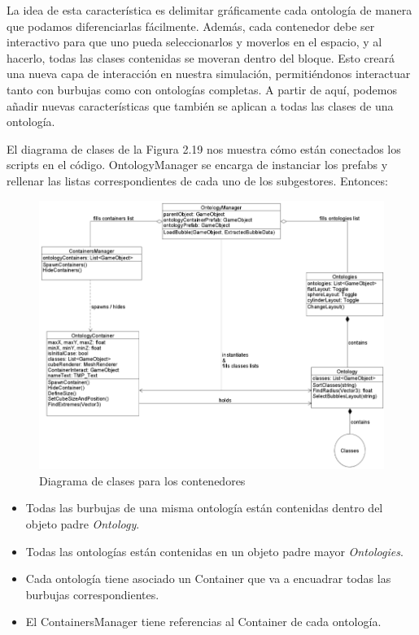 La idea de esta característica es delimitar gráficamente cada ontología de manera que podamos diferenciarlas fácilmente. Además, cada contenedor debe ser interactivo para que uno pueda seleccionarlos y moverlos en el espacio, y al hacerlo, todas las clases contenidas se moveran dentro del bloque. Esto creará una nueva capa de interacción en nuestra simulación, permitiéndonos interactuar tanto con burbujas como con ontologías completas. A partir de aquí, podemos añadir nuevas características que también se aplican a todas las clases de una ontología.

El diagrama de clases de la Figura 2.19 nos muestra cómo están conectados los scripts en el código. OntologyManager se encarga de instanciar los prefabs y rellenar las listas correspondientes de cada uno de los subgestores. Entonces:

\begin{figure}[ht]
   \begin{center}
      \includegraphics[width=1\linewidth]{chapter2/figures/containers_2.0.png}
   \end{center}
   \caption[Diagrama de clases para los contenedores]
   {\footnotesize Diagrama de clases para los contenedores}
\end{figure}

\begin{itemize}
   \item Todas las burbujas de una misma ontología están contenidas dentro del objeto padre \textit{Ontology}.
   \item Todas las ontologías están contenidas en un objeto padre mayor \textit{Ontologies}.
   \item Cada ontología tiene asociado un Container que va a encuadrar todas las burbujas correspondientes.
   \item El ContainersManager tiene referencias al Container de cada ontología.
\end{itemize}


